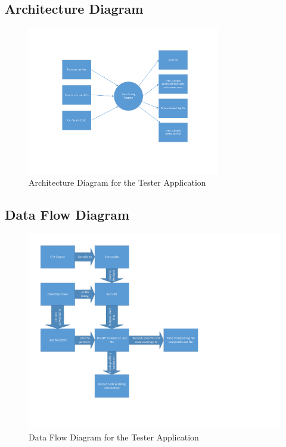 \subsection{Architecture  Diagram}
\begin{figure}[H]
\begin{center}
\includegraphics[width=0.75\textwidth]{./ArchitectDiagram}
\end{center}
\caption{Architecture Diagram for the Tester Application \label{arch_generic}}
\end{figure}


\subsection{Data Flow Diagram} 



\begin{figure}[H]
\begin{center}
\includegraphics[width=1.45\textwidth]{./dataflow}
\end{center}
\caption{ Data Flow Diagram for the Tester Application \label{dataflow}}
\end{figure}


